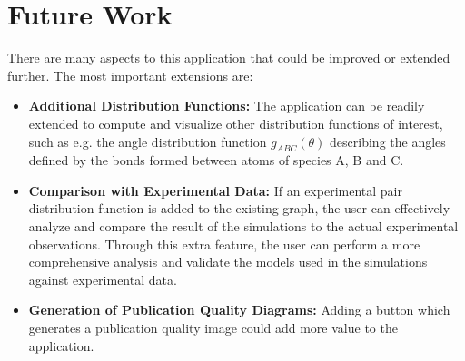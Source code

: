\section*{Future Work}

There are many aspects to this application that could be improved or extended further. The most important extensions are:

\begin{itemize}
	\item \textbf{Additional Distribution Functions:} The application can be readily extended to compute and visualize other distribution functions of interest, such as e.g. the angle distribution function $g_{ABC}(\theta)$ describing the angles defined by the bonds formed between atoms of species A, B and C.
	
	\item \textbf{Comparison with Experimental Data:} If an experimental pair distribution function is added to the existing graph, the user can effectively analyze and compare the result of the simulations to the actual experimental observations. Through this extra feature, the user can perform a more comprehensive analysis and validate the models used in the simulations against experimental data.

  \item \textbf{Generation of Publication Quality Diagrams:} Adding a button which generates a publication quality image could add more value to the application.  

\end{itemize}